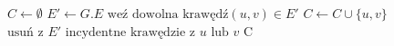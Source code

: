 \begin{algorithm}
\caption{}\label{euclid}
\begin{algorithmic}[1]
\State $C \gets \emptyset$
\State $E' \gets G.E$
\State $\text{weź dowolna krawędź}(u,v) \in E'$
\State $C \gets C \cup \{u,v\}$
\State $\text{usuń z } E' \text{ incydentne krawędzie z } u \text{ lub } v $
\EndWhile
\State \Return C
\EndFunction
\end{algorithmic}
\end{algorithm}